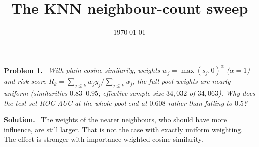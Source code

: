 \documentclass[11pt]{article}
\title{The KNN neighbour-count sweep}
\author{}
\date{\today}
\newenvironment{problem}[1]
  {\par\medskip\noindent\textbf{Problem #1.}\ \itshape}
  {\par\medskip}
\newenvironment{solution}
  {\par\noindent\textbf{Solution.}\ }
  {\par\medskip}
\begin{document}
\maketitle


\begin{problem}{1}
With plain cosine similarity, weights $w_j=\max(s_j,0)^{\alpha}$ ($\alpha=1$) and risk score
$R_k=\sum_{j\le k} w_j y_j/\sum_{j\le k} w_j$, the full-pool weights are nearly uniform
(similarities $0.83$--$0.95$; effective sample size $34{,}032$ of $34{,}063$).
Why does the test-set ROC AUC at the whole pool end at $0.608$ rather than falling to $0.5$?
\end{problem}
\begin{solution}
The weights of the nearer neighbours, who should have more influence, are still larger.
That is not the case with exactly uniform weighting. The effect is stronger with
importance-weighted cosine similarity.
\end{solution}
\end{document}
